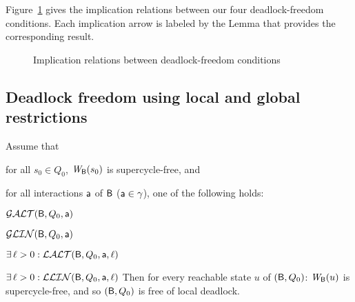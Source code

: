 Figure~\ref{fig:implications} gives the implication relations between our four deadlock-freedom conditions.
Each implication arrow is labeled by the Lemma that provides the corresponding result.
\begin{figure}[ht]
\begin{center}
\scalebox{0.8}{}
\caption{Implication relations between deadlock-freedom conditions}
\label{fig:implications}
\end{center}
\end{figure}






\subsection{Deadlock freedom using local and global restrictions}


\label{theorem:local.deadlock-free}
Assume that
\bn
\item \label{theorem:local.deadlock-free.initial}
      for all $s_0 \in Q_0$, $\mathit{W}_{\mathsf{B}}({s_0})$ is supercycle-free, and
\item \label{theorem:local.deadlock-free.scfPres}
      for all interactions $\mathsf{a}$ of $\mathsf{B}$ (\ie $\mathsf{a} \in \gamma$), one of
      the following holds:
      \bn
      \item $\mathcal{GALT}(\mathsf{B},Q_0,\mathsf{a})$
      \item $\mathcal{GLIN}(\mathsf{B},Q_0,\mathsf{a})$
      \item $\exists\, \ell > 0: \mathcal{LALT}(\mathsf{B},Q_0,\mathsf{a},\ell)$ 
      \item $\exists\, \ell > 0: \mathcal{LLIN}(\mathsf{B},Q_0,\mathsf{a},\ell)$ 
      \en
\en
Then for every reachable state $u$ of $(\mathsf{B}, Q_0)$:  $\mathit{W}_{\mathsf{B}}({u})$ is supercycle-free, and so 
$(\mathsf{B}, Q_0)$ is free of local deadlock.
\et
{}

